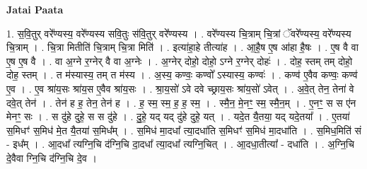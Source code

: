 \documentclass[17pt]{extarticle}
\begin{document}
\textbf{Jatai Paata} \newline

1. स॒वि॒तुर् वरे᳚ण्यस्य॒ वरे᳚ण्यस्य सवि॒तुः स॑वि॒तुर् वरे᳚ण्यस्य । . वरे᳚ण्यस्य चि॒त्राम् चि॒त्रां ॅवरे᳚ण्यस्य॒ वरे᳚ण्यस्य चि॒त्राम् । . चि॒त्रा मितीति॑ चि॒त्राम् चि॒त्रा मिति॑ । . इत्या॑हा॒हे तीत्या॑ह । . आ॒है॒ष ए॒ष आ॑हा है॒षः । . ए॒ष वै वा ए॒ष ए॒ष वै । . वा अ॒ग्ने र॒ग्नेर् वै वा अ॒ग्नेः । . अ॒ग्नेर् दोहो॒ दोहो॒ ऽग्ने र॒ग्नेर् दोहः॑ । . दोह॒ स्तम् तम् दोहो॒ दोह॒ स्तम् । . त म॑स्यास्य॒ तम् त म॑स्य । . अ॒स्य॒ कण्वः॒ कण्वो᳚ ऽस्यास्य॒ कण्वः॑ । . कण्व॑ ए॒वैव कण्वः॒ कण्व॑ ए॒व । . ए॒व श्रा॑य॒सः श्रा॑य॒स ए॒वैव श्रा॑य॒सः । . श्रा॒य॒सो॑ ऽवे दवे च्छ्राय॒सः श्रा॑य॒सो॑ ऽवेत् । . अ॒वे॒त् तेन॒ तेना॑ वे दवे॒त् तेन॑ । . तेन॑ ह ह॒ तेन॒ तेन॑ ह । . ह॒ स्म॒ स्म॒ ह॒ ह॒ स्म॒ । . स्मै॒न॒ मे॒नꣳ॒॒ स्म॒ स्मै॒न॒म् । . ए॒नꣳ॒॒ स स ए॑न मेनꣳ॒॒ सः । . स दु॑हे दुहे॒ स स दु॑हे । . दु॒हे॒ यद् यद् दु॑हे दुहे॒ यत् । . यदे॒त यै॒तया॒ यद् यदे॒तया᳚ । . ए॒तया॑ स॒मिधꣳ॑ स॒मिध॑ मे॒त यै॒तया॑ स॒मिध᳚म् । . स॒मिध॑ मा॒दधा᳚ त्या॒दधा॑ति स॒मिधꣳ॑ स॒मिध॑ मा॒दधा॑ति । . स॒मिध॒मिति॑ सं - इध᳚म् । . आ॒दधा᳚ त्यग्नि॒चि द॑ग्नि॒चि दा॒दधा᳚ त्या॒दधा᳚ त्यग्नि॒चित् । . आ॒दधा॒तीत्या᳚ - दधा॑ति । . अ॒ग्नि॒चि दे॒वैवा ग्नि॒चि द॑ग्नि॒चि दे॒व । \newline
\end{document}
